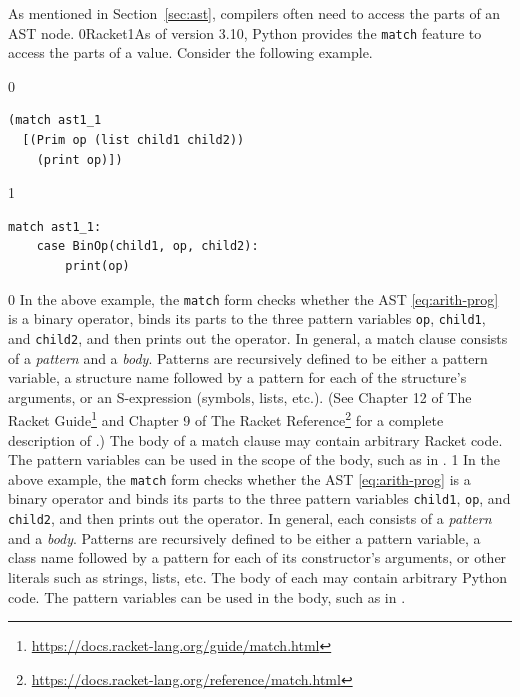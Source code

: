 \documentclass[7x10]{TimesAPriori_MIT}%
\def\racketEd{0}
\def\pythonEd{1}
\def\edition{1}
\newcommand{\racket}[1]{{\if\edition\racketEd{#1}\fi}}
\newcommand{\python}[1]{{\if\edition\pythonEd #1\fi}}
\begin{document}
As mentioned in Section~\ref{sec:ast}, compilers often need to access
the parts of an AST node. \racket{Racket}\python{As of version 3.10, Python} provides the
\texttt{match} feature to access the parts of a value.
Consider the following example.  
\begin{center}
\begin{minipage}{0.5\textwidth}
{\if\edition\racketEd
\begin{lstlisting}
(match ast1_1
  [(Prim op (list child1 child2))
    (print op)])
\end{lstlisting}
\fi}
{\if\edition\pythonEd
\begin{lstlisting}
match ast1_1:
    case BinOp(child1, op, child2):
        print(op)
\end{lstlisting}
\fi}  
\end{minipage}
\end{center}

{\if\edition\racketEd
%
In the above example, the \texttt{match} form checks whether the AST
\eqref{eq:arith-prog} is a binary operator, binds its parts to the
three pattern variables \texttt{op}, \texttt{child1}, and
\texttt{child2}, and then prints out the operator. In general, a match
clause consists of a \emph{pattern} and a
\emph{body}. Patterns are recursively defined
to be either a pattern variable, a structure name followed by a
pattern for each of the structure's arguments, or an S-expression
(symbols, lists, etc.).  (See Chapter 12 of The Racket
Guide\footnote{\url{https://docs.racket-lang.org/guide/match.html}}
and Chapter 9 of The Racket
Reference\footnote{\url{https://docs.racket-lang.org/reference/match.html}}
for a complete description of .)
%
The body of a match clause may contain arbitrary Racket code.  The
pattern variables can be used in the scope of the body, such as
 in .
%
\fi}
%
%
{\if\edition\pythonEd
%  
In the above example, the \texttt{match} form checks whether the AST
\eqref{eq:arith-prog} is a binary operator and binds its parts to the
three pattern variables \texttt{child1}, \texttt{op}, and
\texttt{child2}, and then prints out the operator. In general, each
 consists of a \emph{pattern} and a
\emph{body}. Patterns are recursively defined
to be either a pattern variable, a class name followed by a pattern
for each of its constructor's arguments, or other literals such as
strings, lists, etc.
%
The body of each  may contain arbitrary Python code. The
pattern variables can be used in the body, such as  in
.
%
\fi}
\end{document}
